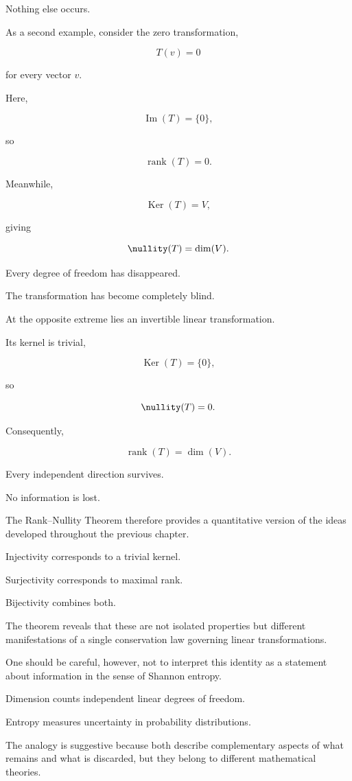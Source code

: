 \documentclass[11pt]{book}
\numberwithin{equation}{chapter}
\theoremstyle{definition}
\theoremstyle{plain}
\theoremstyle{remark}
\DeclareMathOperator{\Ker}{Ker}
\DeclareMathOperator{\Image}{Im}
\DeclareMathOperator{\rank}{rank}
\begin{document}
Nothing else occurs.

As a second example, consider the zero transformation,

\[
T(v)=0
\]

for every vector \(v\).

Here,

\[
\Image(T)
=
\{0\},
\]

so

\[
\rank(T)=0.
\]

Meanwhile,

\[
\Ker(T)=V,
\]

giving

\[
\nullity(T)
=
\dim(V).
\]

Every degree of freedom has disappeared.

The transformation has become completely blind.

At the opposite extreme lies an invertible linear transformation.

Its kernel is trivial,

\[
\Ker(T)
=
\{0\},
\]

so

\[
\nullity(T)=0.
\]

Consequently,

\[
\rank(T)
=
\dim(V).
\]

Every independent direction survives.

No information is lost.

The Rank--Nullity Theorem therefore provides a quantitative version of the ideas developed throughout the previous chapter.

Injectivity corresponds to a trivial kernel.

Surjectivity corresponds to maximal rank.

Bijectivity combines both.

The theorem reveals that these are not isolated properties but different manifestations of a single conservation law governing linear transformations.

One should be careful, however, not to interpret this identity as a statement about information in the sense of Shannon entropy.

Dimension counts independent linear degrees of freedom.

Entropy measures uncertainty in probability distributions.

The analogy is suggestive because both describe complementary aspects of what remains and what is discarded, but they belong to different mathematical theories.
\end{document}

